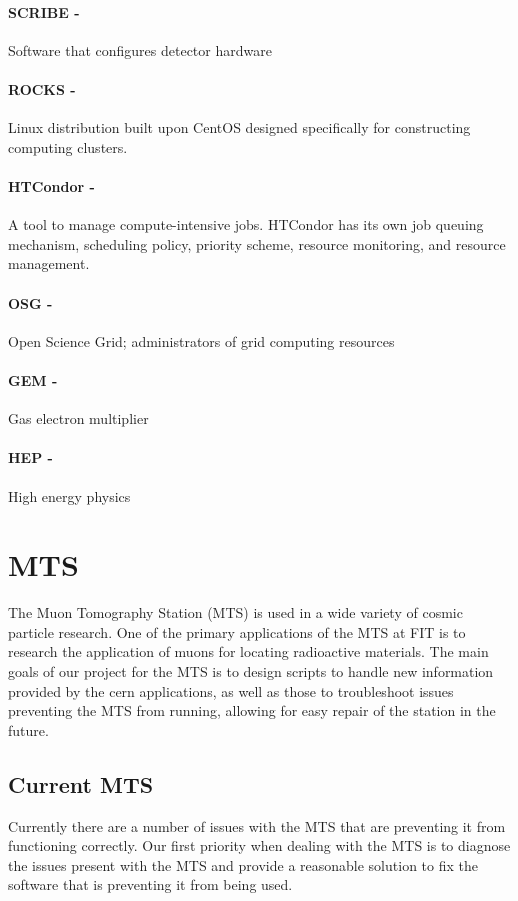\documentclass[12pt]{article}
\newcommand\tab[1][1cm]{\hspace*{#1}}
\begin{document}
\paragraph{SCRIBE -} Software that configures detector hardware
\paragraph{ROCKS -} Linux distribution built upon CentOS designed specifically for constructing computing clusters.
\paragraph{HTCondor -} A tool to manage compute-intensive jobs. HTCondor has its own job 
queuing mechanism, scheduling policy, priority scheme, resource monitoring, and resource management.
\paragraph{OSG -} Open Science Grid; administrators of grid computing resources
\paragraph{GEM -} Gas electron multiplier
\paragraph{HEP -} High energy physics

\section*{MTS}
%
\tab The Muon Tomography Station (MTS) is used in a wide variety of cosmic particle research. One of the primary applications of the MTS at FIT is to research the application of muons for locating radioactive materials. The main goals of our project for the MTS is to design scripts to handle new information provided by the cern applications, as well as those to troubleshoot issues preventing the MTS from running, allowing for easy repair of the station in the future.
\subsection*{Current MTS}
%
\tab Currently there are a number of issues with the MTS that are preventing it from functioning correctly. Our first priority when dealing with the MTS is to diagnose the issues present with the MTS and provide a reasonable solution to fix the software that is preventing it from being used.
\end{document}
